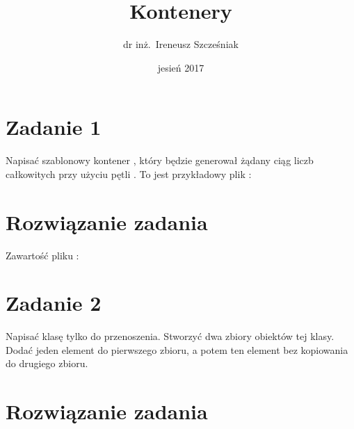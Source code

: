 \documentclass{article}
\title{Kontenery}
\author{dr inż.~Ireneusz Szcześniak}
\date{jesień 2017}
\begin{document}
\maketitle

\section{Zadanie 1}

Napisać szablonowy kontener , który będzie generował
żądany ciąg liczb całkowitych przy użyciu pętli .  To jest
przykładowy plik :



\section{Rozwiązanie zadania}

Zawartość pliku :



\section{Zadanie 2}

Napisać klasę  tylko do przenoszenia.  Stworzyć dwa zbiory
obiektów tej klasy.  Dodać jeden element do pierwszego zbioru, a potem
ten element bez kopiowania do drugiego zbioru.

\section{Rozwiązanie zadania}


\end{document}
